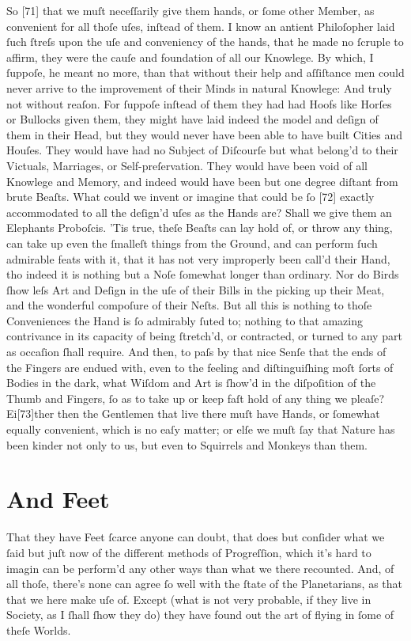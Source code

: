 \documentclass[letterpaper]{book}
\begin{document}
So [71] that we muſt neceſſarily give them hands, or ſome other Member, as
convenient for all thoſe uſes, inſtead of them. I know an antient
Philoſopher laid ſuch ſtreſs upon the uſe and conveniency of the hands, that
he made no ſcruple to affirm, they were the cauſe and foundation of all our
Knowlege.  By which, I ſuppoſe, he meant no more, than that without their
help and aſſiſtance men could never arrive to the improvement of their Minds
in natural Knowlege: And truly not without reaſon. For ſuppoſe inſtead of
them they had had Hoofs like Horſes or Bullocks given them, they might have
laid indeed the model and deſign of them in their Head, but they would never
have been able to have built Cities and Houſes. They would have had no
Subject of Diſcourſe but what belong'd to their Victuals, Marriages, or
Self-preſervation. They would have been void of all Knowlege and Memory, and
indeed would have been but one degree diſtant from brute Beaſts. What could
we invent or imagine that could be ſo [72] exactly accommodated to all the
deſign'd uſes as the Hands are? Shall we give them an Elephants Proboſcis.
'Tis true, theſe Beaſts can lay hold of, or throw any thing, can take up
even the ſmalleſt things from the Ground, and can perform ſuch admirable
feats with it, that it has not very improperly been call'd their Hand, tho
indeed it is nothing but a Noſe ſomewhat longer than ordinary.  Nor do Birds
ſhow leſs Art and Deſign in the uſe of their Bills in the picking up their
Meat, and the wonderful compoſure of their Neſts. But all this is nothing to
thoſe Conveniences the Hand is ſo admirably ſuted to; nothing to that
amazing contrivance in its capacity of being ſtretch'd, or contracted, or
turned to any part as occaſion ſhall require. And then, to paſs by that nice
Senſe that the ends of the Fingers are endued with, even to the feeling and
diſtinguiſhing moſt ſorts of Bodies in the dark, what Wiſdom and Art is
ſhow'd in the diſpoſition of the Thumb and Fingers, ſo as to take up or keep
faſt hold of any thing we pleaſe? Ei[73]ther then the Gentlemen that live
there muſt have Hands, or ſomewhat equally convenient, which is no eaſy
matter; or elſe we muſt ſay that Nature has been kinder not only to us, but
even to Squirrels and Monkeys than them.


\section{And Feet}

That they have Feet ſcarce anyone can doubt, that does but conſider what we
ſaid but juſt now of the different methods of Progreſſion, which it's hard
to imagin can be perform'd any other ways than what we there recounted.
And, of all thoſe, there's none can agree ſo well with the ſtate of the
Planetarians, as that that we here make uſe of. Except (what is not very
probable, if they live in Society, as I ſhall ſhow they do) they have found
out the art of flying in ſome of theſe Worlds.
\end{document}
